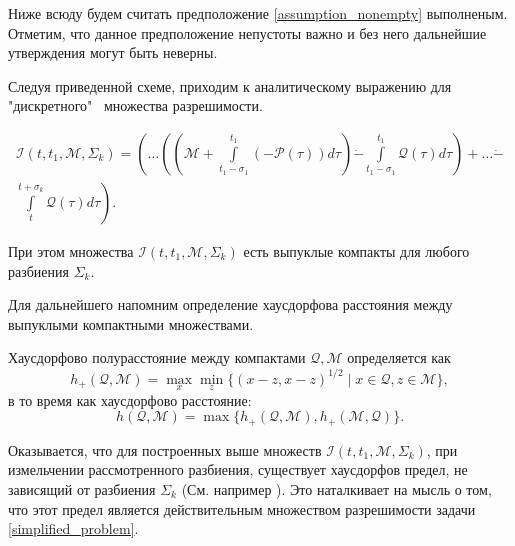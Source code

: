 Ниже всюду будем считать предположение \eqref{assumption_nonempty} выполненым. Отметим,
 что данное предположение непустоты важно и без него дальнейшие утверждения могут быть неверны.

Следуя приведенной схеме, приходим к аналитическому выражению для "дискретного" \ множества
 разрешимости.

\begin{multline}\label{pontr_analytical}
    \mathcal{I}(t, t_1, \mathcal{M}, \Sigma_k) = \left( \dots \left( \left( \mathcal{M} + 
     \int\limits_{t_1 - \sigma_1}^{t_1} (-\mathcal{P}(\tau)) d\tau \right) \dot{-} \int\limits_
     {t_1 - \sigma_1}^{t_1} \mathcal{Q}(\tau) d\tau \right) + \dots \dot{-} \right. \\
    \left. \int\limits_t^{t + \sigma_k} \mathcal{Q}(\tau) d\tau \right).
\end{multline}

При этом множества \( \mathcal{I} (t, t_1, \mathcal{M}, \Sigma_k) \) есть выпуклые компакты 
 для любого разбиения \( \Sigma_k \).

Для дальнейшего напомним определение хаусдорфова расстояния между выпуклыми компактными 
 множествами.

\begin{definition}
    Хаусдорфово полурасстояние между компактами \( \mathcal{Q}, \mathcal{M} \)
    определяется как 
    \begin{equation*} 
        h_+(\mathcal{Q}, \mathcal{M}) = \max_x \min_z \{(x - z, x - z)^{1/2} \mid x \in \mathcal{Q}, 
        z \in \mathcal{M} \},
    \end{equation*}
    в то время как хаусдорфово расстояние:
    \begin{equation*}
        h(\mathcal{Q}, \mathcal{M}) = \max \{ h_+(\mathcal{Q}, \mathcal{M}), 
         h_+(\mathcal{M}, \mathcal{Q}) \}.
    \end{equation*}
\end{definition}
        
Оказывается, что для построенных выше множеств \( \mathcal{I}(t, t_1, \mathcal{M}, \Sigma_k) \), при измельчении
 рассмотренного разбиения, существует хаусдорфов предел, не зависящий от 
 разбиения \( \Sigma_k \) (См. например \cite{lin_dif_chasing}). Это наталкивает на мысль о том,
 что этот предел является действительным множеством разрешимости задачи \eqref{simplified_problem}.

